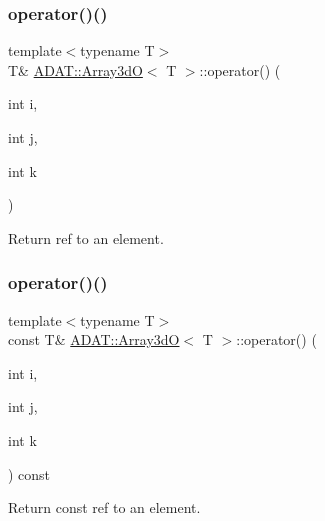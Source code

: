 \subsubsection{\texorpdfstring{operator()()}{operator()()}\hspace{0.1cm}{\footnotesize\ttfamily [2/4]}}
{\footnotesize\ttfamily template$<$typename T$>$ \\
T\& \mbox{\hyperlink{classADAT_1_1Array3dO}{A\+D\+A\+T\+::\+Array3dO}}$<$ T $>$\+::operator() (\begin{DoxyParamCaption}\item[{int}]{i,  }\item[{int}]{j,  }\item[{int}]{k }\end{DoxyParamCaption})\hspace{0.3cm}{\ttfamily [inline]}}



Return ref to an element. 

\mbox{\label{classADAT_1_1Array3dO_a3b4254a3812d8a02c4510f4fa635dd9c}} 
\subsubsection{\texorpdfstring{operator()()}{operator()()}\hspace{0.1cm}{\footnotesize\ttfamily [3/4]}}
{\footnotesize\ttfamily template$<$typename T$>$ \\
const T\& \mbox{\hyperlink{classADAT_1_1Array3dO}{A\+D\+A\+T\+::\+Array3dO}}$<$ T $>$\+::operator() (\begin{DoxyParamCaption}\item[{int}]{i,  }\item[{int}]{j,  }\item[{int}]{k }\end{DoxyParamCaption}) const\hspace{0.3cm}{\ttfamily [inline]}}



Return const ref to an element. 

\mbox{\label{classADAT_1_1Array3dO_a3b4254a3812d8a02c4510f4fa635dd9c}} 

